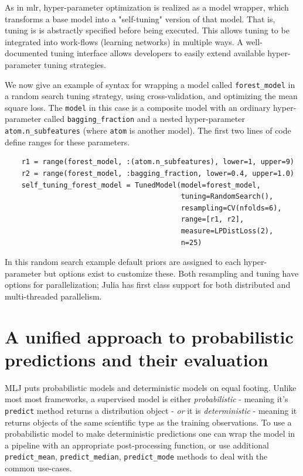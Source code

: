 \documentclass{article}
\begin{document}
As in mlr, hyper-parameter optimization is realized as a model
wrapper, which transforms a base model into a "self-tuning" version of
that model. That is, tuning is is abstractly specified before being
executed. This allows tuning to be integrated into work-flows
(learning networks) in multiple ways. A well-documented tuning
interface \cite{MLJTuning} allows developers to easily extend
available hyper-parameter tuning strategies.

We now give an example of syntax for wrapping a model called
\texttt{forest\_model} in a random search tuning strategy, using
cross-validation, and optimizing the mean square loss. The
\texttt{model} in this case is a composite model with an ordinary
hyper-parameter called \texttt{bagging\_fraction} and a nested
hyper-parameter \texttt{atom.n\_subfeatures} (where \texttt{atom} is
another model). The first two lines of code define ranges for these
parameters.

\begin{verbatim}
    r1 = range(forest_model, :(atom.n_subfeatures), lower=1, upper=9)
    r2 = range(forest_model, :bagging_fraction, lower=0.4, upper=1.0)
    self_tuning_forest_model = TunedModel(model=forest_model,
                                          tuning=RandomSearch(),
                                          resampling=CV(nfolds=6),
                                          range=[r1, r2],
                                          measure=LPDistLoss(2),
                                          n=25)
\end{verbatim}

In this random search example default priors are assigned to each
hyper-parameter but options exist to customize these. Both resampling
and tuning have options for parallelization; Julia has first class
support for both distributed and multi-threaded parallelism.

\section{A unified approach to probabilistic predictions and their
  evaluation}

MLJ puts probabilistic models and deterministic models on equal
footing. Unlike most most frameworks, a supervised model is either
\textit{probabilistic} - meaning it's \texttt{predict} method returns a
distribution object - \textit{or} it is \textit{deterministic} -
meaning it returns objects of the same scientific type as the training
observations. To use a probabilistic model to make deterministic
predictions one can wrap the model in a pipeline with an appropriate
post-processing function, or use additional \texttt{predict\_mean},
\texttt{predict\_median}, \texttt{predict\_mode} methods to deal with
the common use-cases.
\end{document}
